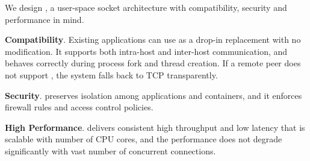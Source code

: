 We design \sys{}, a user-space socket architecture with compatibility, security and performance in mind.
\begin{ecompact}
	\item \textbf{Compatibility}.
	Existing applications can use \sys{} as a drop-in replacement with no modification.
	It supports both intra-host and inter-host communication, and behaves correctly during process fork and thread creation.
	If a remote peer does not support \sys{}, the system falls back to TCP transparently.
	\item \textbf{Security}.
	\sys{} preserves isolation among applications and containers, and it enforces firewall rules and access control policies.
	\item \textbf{High Performance}.
	\sys{} delivers consistent high throughput and low latency that is scalable with number of CPU cores, and the performance does not degrade significantly with vast number of concurrent connections.
\end{ecompact}








